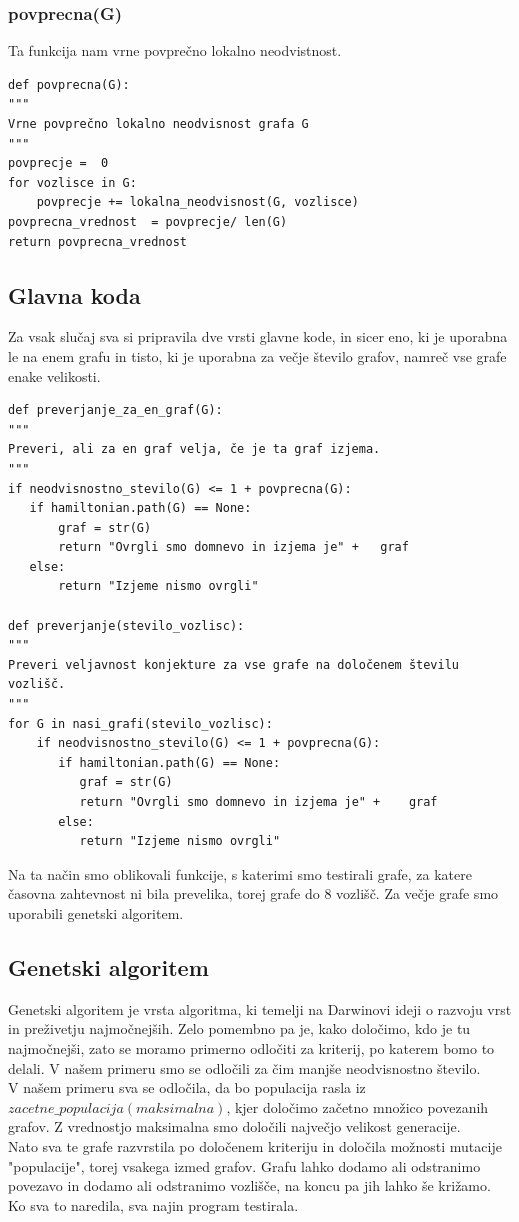 \documentclass[12pt,a4paper]{amsart}
\theoremstyle{definition} %
\theoremstyle{plain} %
\begin{document}
\subsubsection{povprecna(G)}
Ta funkcija nam vrne povprečno lokalno neodvistnost.
\begin{verbatim}
def povprecna(G):
"""
Vrne povprečno lokalno neodvisnost grafa G
"""
povprecje =  0
for vozlisce in G:
    povprecje += lokalna_neodvisnost(G, vozlisce)
povprecna_vrednost  = povprecje/ len(G)
return povprecna_vrednost
\end{verbatim}

\subsection{Glavna koda}
Za vsak slučaj sva si pripravila dve vrsti glavne kode, in sicer eno, ki je uporabna le na enem grafu in tisto, ki je uporabna za večje število grafov, namreč vse grafe enake velikosti.

\begin{verbatim}
def preverjanje_za_en_graf(G):
"""
Preveri, ali za en graf velja, če je ta graf izjema.
"""
if neodvisnostno_stevilo(G) <= 1 + povprecna(G):
   if hamiltonian.path(G) == None:
       graf = str(G)
       return "Ovrgli smo domnevo in izjema je" + 	graf
   else:
       return "Izjeme nismo ovrgli"

def preverjanje(stevilo_vozlisc):
"""
Preveri veljavnost konjekture za vse grafe na določenem številu vozlišč.
"""
for G in nasi_grafi(stevilo_vozlisc):
    if neodvisnostno_stevilo(G) <= 1 + povprecna(G):
       if hamiltonian.path(G) == None:
          graf = str(G)
          return "Ovrgli smo domnevo in izjema je" + 	graf
       else:
          return "Izjeme nismo ovrgli"
\end{verbatim}

Na ta način smo oblikovali funkcije, s katerimi smo testirali grafe, za katere časovna zahtevnost ni bila prevelika, torej grafe do $8$ vozlišč. Za večje grafe smo uporabili genetski algoritem.
\subsection{Genetski algoritem}

Genetski algoritem je vrsta algoritma, ki temelji na Darwinovi ideji o razvoju vrst in preživetju najmočnejših. Zelo pomembno pa je, kako določimo, kdo je tu najmočnejši, zato se moramo primerno odločiti za kriterij, po katerem bomo to delali. V našem primeru smo se odločili za čim manjše neodvisnostno število.\\

V našem primeru sva se odločila, da bo populacija rasla iz $zacetne\_populacija(maksimalna)$, kjer določimo začetno množico povezanih grafov. Z vrednostjo maksimalna smo določili največjo velikost generacije.\\
Nato sva te grafe razvrstila po določenem kriteriju in določila možnosti mutacije "populacije", torej vsakega izmed grafov. Grafu lahko dodamo ali odstranimo povezavo in dodamo ali odstranimo vozlišče, na koncu pa jih lahko še križamo.\\
Ko sva to naredila, sva najin program testirala.
\end{document}
